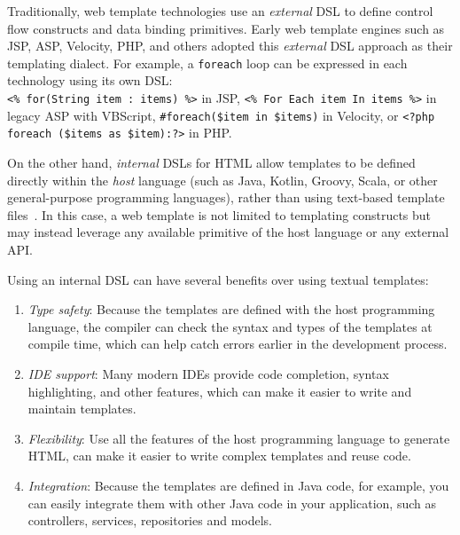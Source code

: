 Traditionally, web template technologies use an \textit{external} DSL to define
control flow constructs and data binding primitives. Early web template engines
such as JSP, ASP, Velocity, PHP, and others adopted this \textit{external} DSL
approach as their templating dialect. For example, a \texttt{foreach} loop can
be expressed in each technology using its own DSL: \\\texttt{<\% for(String
  item : items) \%>} in JSP, \texttt{<\% For Each item In items \%>} in legacy
ASP with VBScript, \texttt{\#foreach(\$item in \$items)} in Velocity, or
\texttt{<?php foreach (\$items as \$item):?>} in PHP.

On the other hand, \textit{internal} DSLs for HTML allow templates to be
defined directly within the \emph{host} language (such as Java, Kotlin, Groovy,
Scala, or other general-purpose programming languages), rather than using
text-based template files~\cite{carvalho2019hot}. In this case, a web template
is not limited to templating constructs but may instead leverage any available
primitive of the host language or any external API.

Using an internal DSL can have several benefits over using textual templates:
\begin{enumerate}
  \item \emph{Type safety}: Because the templates are defined with the host
        programming language, the compiler can check the syntax and types of the
        templates at compile time, which can help catch errors earlier in the
        development process.

  \item \emph{IDE support}: Many modern IDEs provide code completion, syntax
        highlighting, and other features, which can make it easier to write and
        maintain templates.

  \item \emph{Flexibility}: Use all the features of the host programming language
        to generate HTML, can make it easier to write complex templates and reuse code.

  \item \emph{Integration}: Because the templates are defined in Java code, for
        example, you can easily integrate them with other Java code in your
        application, such as controllers, services, repositories and models.

\end{enumerate}

